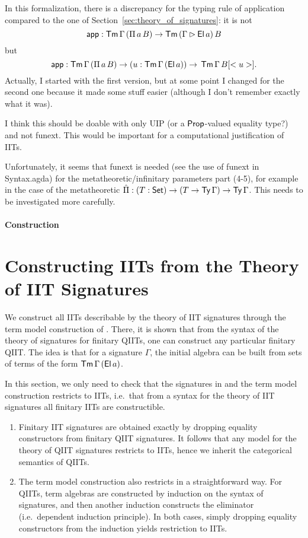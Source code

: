 \documentclass[a4paper,UKenglish,cleveref, autoref]{lipics-v2019}
\begin{document}
In this formalization, there is a discrepancy for the typing rule of application
compared to the one of Section~\ref{sec:theory_of_signatures}: it is not
\[
   \mathsf{app}  : \mathsf{Tm}\,\Gamma\,(\Pi\,a\,B)\rightarrow\mathsf{Tm}\,(\Gamma\rhd \mathsf{El}\,a)\,B
\]
but
\[
   \mathsf{app}  : \mathsf{Tm}\,\Gamma\,(\Pi\,a\,B)\rightarrow(u : \mathsf{Tm}\,\Gamma\,(\mathsf{El}\,a))\rightarrow\,\mathsf{Tm}\,\Gamma\,B[<u>].
\]
Actually, I started with the first version, but at some point I
changed for the second one because it made some stuff easier (although
I don't remember exactly what it was).

I think this should be doable with only UIP (or a $\mathsf{Prop}$-valued
equality type?) and not funext. This would be important for a
computational justification of IITs.

Unfortunately, it seems that funext is needed (see the use of funext in
Syntax.agda) for the metatheoretic/infinitary
parameters part (4-5), for example in the case of the metatheoretic
$ \hat{\Pi}  : (T:\mathsf{Set})\rightarrow(T\rightarrow\mathsf{Ty}\,\Gamma)\rightarrow\mathsf{Ty}\,\Gamma $. This needs to be
investigated more carefully.

\paragraph*{Construction}


\section{Constructing IITs from the Theory of IIT Signatures}
\label{sec:andras}

We construct all IITs describable by the theory of IIT signatures through the
term model construction of \cite{Kaposi:2019:CQI:3302515.3290315}. There, it is
shown that from the syntax of the theory of signatures for finitary QIITs, one
can construct any particular finitary QIIT. The idea is that for a signature
$\Gamma$, the initial algebra can be built from sets of terms of the form
$\mathsf{Tm}\,\Gamma\,(\mathsf{El}\,a)$.

In this section, we only need to check that the signatures in
\cite{Kaposi:2019:CQI:3302515.3290315} and the term model construction restricts
to IITs, i.e.\ that from a syntax for the theory of IIT signatures all finitary
IITs are constructible.

\begin{enumerate}
\item
  Finitary IIT signatures are obtained exactly by dropping equality constructors from
  finitary QIIT signatures. It follows that any model for the theory of QIIT signatures
  restricts to IITs, hence we inherit the categorical semantics of QIITs.
\item
  The term model construction also restricts in a straightforward way. For QIITs,
  term algebras are constructed by induction on the syntax of signatures, and
  then another induction constructs the eliminator (i.e.\ dependent induction
  principle). In both cases, simply dropping equality constructors from the
  induction yields restriction to IITs.
\end{enumerate}
\end{document}
